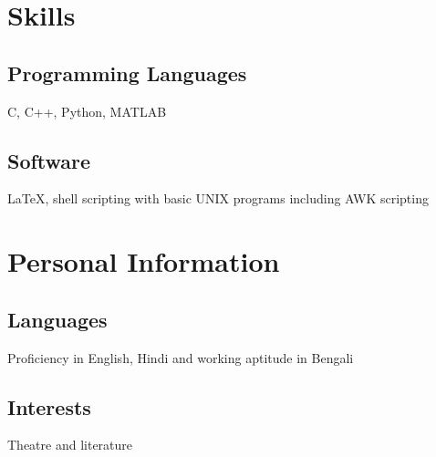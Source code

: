 \documentclass{article}
\begin{document}
\section{Skills}

\subsection{Programming Languages}
C, C++, Python, MATLAB

\subsection{Software}
\LaTeX,
shell scripting with basic UNIX programs
including AWK scripting


\section{Personal Information}

\subsection{Languages}
Proficiency in English, Hindi
and working aptitude in Bengali
\subsection{Interests}
Theatre and literature
\end{document}
